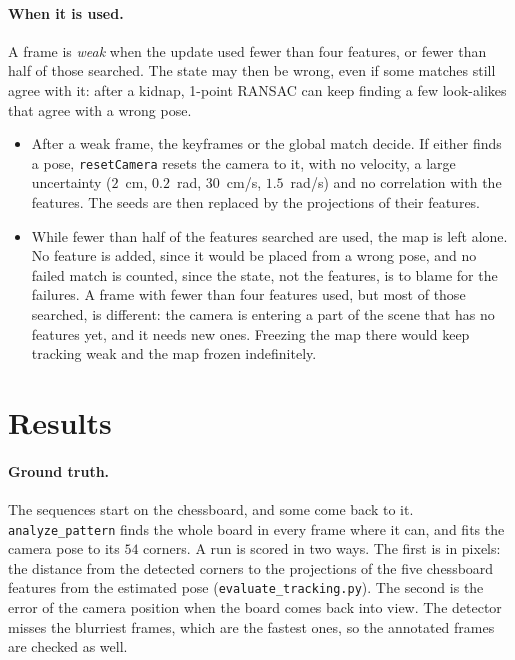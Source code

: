 \documentclass[11pt]{article}
\begin{document}
\paragraph{When it is used.}
A frame is \emph{weak} when the update used fewer than four features, or fewer than half of those
searched. The state may then be wrong, even if some matches still agree with it: after a kidnap,
1-point RANSAC can keep finding a few look-alikes that agree with a wrong pose.
\begin{itemize}
  \item After a weak frame, the keyframes or the global match decide. If either finds a pose,
        \texttt{resetCamera} resets the camera to it, with no velocity, a large uncertainty
        ($2$~cm, $0.2$~rad, $30$~cm/s, $1.5$~rad/s) and no correlation with the features. The seeds
        are then replaced by the projections of their features.
  \item While fewer than half of the features searched are used, the map is left alone. No feature
        is added, since it would be placed from a wrong pose, and no failed match is counted, since
        the state, not the features, is to blame for the failures. A frame with fewer than four features used, but
        most of those searched, is different: the camera is entering a part of the scene that has
        no features yet, and it needs new ones. Freezing the map there would keep tracking weak
        and the map frozen indefinitely.
\end{itemize}

\section{Results}
\label{sec:results}

\paragraph{Ground truth.}
The sequences start on the chessboard, and some come back to it. \texttt{analyze\_pattern} finds
the whole board in every frame where it can, and fits the camera pose to its $54$ corners. A run is
scored in two ways. The first is in pixels: the distance from the detected corners to the
projections of the five chessboard features from the estimated pose
(\texttt{evaluate\_tracking.py}). The second is the error of the camera position when the board
comes back into view. The detector misses the blurriest frames,
which are the fastest ones, so the annotated frames are checked as well.
\end{document}

